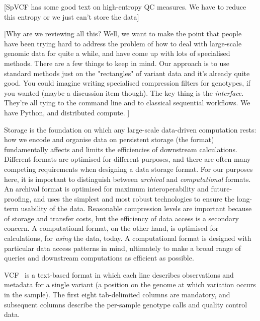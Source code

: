 \documentclass[a4paper,num-refs]{oup-contemporary}
\begin{document}
[SpVCF has some good text on high-entropy QC measures. We have to
reduce this entropy or we just can't store the data]


[Why are we reviewing all this? Well, we want to make the point
that people have been trying hard to address the problem of
how to deal with large-scale genomic data for quite a while,
and have come up with lots of specialised methods. There
are a few things to keep in mind. Our approach is to use
standard methods just on the "rectangles" of variant data
and it's already quite good. You could imagine writing specialised
compression filters for genotypes, if you wanted (maybe a
discussion item though). The key thing is the \emph{interface}.
They're all tying to the command line and to classical
sequential workflows. We have Python, and distributed compute. ]

Storage is the foundation on which any large-scale data-driven computation
rests: how we encode and organise data on persistent storage (the format)
fundamentally affects and limits the efficiencies of downstream calculations.
Different formats are optimised for different purposes, and there are
often many competing requirements when designing a data storage format.
For our  purposes here, it is important to distinguish between \emph{archival}
and \emph{computational} formats. An archival format is optimised for
maximum interoperability and future-proofing, and uses the simplest and
most robust technologies to ensure the long-term usability of the data.
Reasonable compression levels are important because
of storage and transfer costs, but the efficiency of data access is a
secondary concern.
A computational format, on the other hand, is optimised
for calculations, for \emph{using} the data, today. A computational format
is designed with particular data access patterns in mind, ultimately
to make a broad range of queries and downstream computations as efficient as
possible.

VCF~\citep{danecek2011variant} is a text-based format in which each line
describes observations
and metadata for a single variant (a position on the genome at which
variation occurs in the sample). The first eight tab-delimited
columns are mandatory, and subsequent columns describe the per-sample
genotype calls and quality control data.
\end{document}
